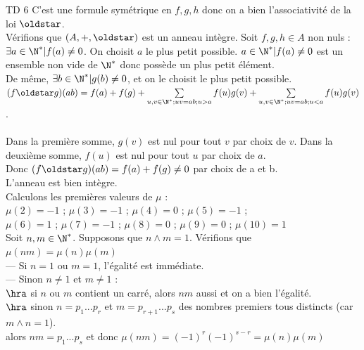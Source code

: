 \documentclass[11pt]{article}
\begin{document}
\begin{exercice}{TD 6}{}
    C'est une formule symétrique en $f, g, h$ donc on a bien l'associativité de la loi $ \oldstar $.\\
    Vérifions que $(A, +, \oldstar)$ est un anneau intègre. Soit $f, g, h \in A$ non nuls :\\
    $\exists a \in \N^* | f(a) \ne 0$. On choisit $a$ le plus petit possible. ${a\in \N^*|f(a)\ne 0}$ est un ensemble non vide de $\N^*$ donc possède un plus petit élément.\\
    De même, $\exists b \in \N^* | g(b) \ne 0$, et on le choisit le plus petit possible.\\
    $(f \oldstar g)(ab) = f(a) + f(g) + \sum\limits_{u,v \in \N^*; uv=ab; u > a}f(u)g(v) + \sum\limits_{u,v \in \N^*; uv=ab; u < a}f(u)g(v)$.\\
    \\
    Dans la première somme, $g(v)$ est nul pour tout $v$ par choix de $v$. Dans la deuxième somme, $f(u)$ est nul pour tout $u$ par choix de $a$.\\
    Donc $(f \oldstar g)(ab) = f(a) + f(g) \ne 0$ par choix de a et b.\\
    L'anneau est bien intègre.\\
     Calculons les premières valeurs de $\mu$ :\\
    $\mu(2) = -1$ ; $\mu(3) = -1$ ; $\mu(4) = 0$ ; $\mu(5) = -1$ ; \\
    $\mu(6) = 1$ ; $\mu(7) = -1$ ; $\mu(8) = 0$ ; $\mu(9) = 0$ ; $\mu(10) = 1$ \\
    Soit $n,m \in \N^*$. Supposons que $n \land m = 1$. Vérifions que $\mu(nm) = \mu(n)\mu(m)$\\
    --- Si $n = 1$ ou $m = 1$, l'égalité est immédiate.\\
    --- Sinon $n \ne 1$ et $m \ne 1$ : \\
    $\hra $ si $n$ ou $m$ contient un carré, alors $nm$ aussi et on a bien l'égalité.\\
    $\hra $ sinon $n = p_1...p_r$ et $m = p_{r+1}...p_s$ des nombres premiers tous distincts (car $m \land n = 1$).\\
    alors $nm = p_1...p_s$ et donc $\mu (nm) = (-1)^r (-1)^{s-r} = \mu (n) \mu(m)$\\


\end{exercice}
\end{document}

